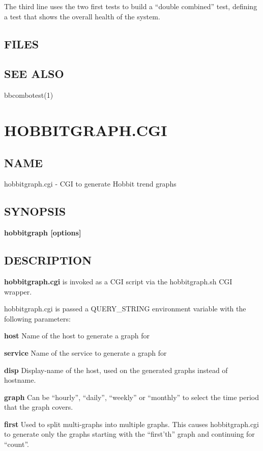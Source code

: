  The third line uses the two first tests to build a ``double
  combined'' test, defining a test that shows the overall health of
  the system. 

 
\subsection{FILES}
\textbf{}

 
\subsection{SEE ALSO}
bbcombotest(1) 


%
\newpage
\section{HOBBITGRAPH.CGI}


\subsection{NAME}
 hobbitgraph.cgi - CGI to generate Hobbit trend graphs \subsection{SYNOPSIS}
\textbf{hobbitgraph [options]}


 
\subsection{DESCRIPTION}
\textbf{hobbitgraph.cgi}
 is invoked as a CGI script via the hobbitgraph.sh CGI wrapper. 

  hobbitgraph.cgi is passed a QUERY\_STRING environment variable with the following parameters: 


 \textbf{host}
 Name of the host to generate a graph for 


 \textbf{service}
 Name of the service to generate a graph for 


 \textbf{disp}
 Display-name of the host, used on the generated graphs instead of hostname. 


 \textbf{graph}
 Can be ``hourly'', ``daily'', ``weekly'' or ``monthly'' to select the time period that the graph covers. 


 \textbf{first}
 Used to split multi-graphs into multiple graphs. This causes hobbitgraph.cgi to generate only the graphs starting with the ``first'th'' graph and continuing for ``count''. 


